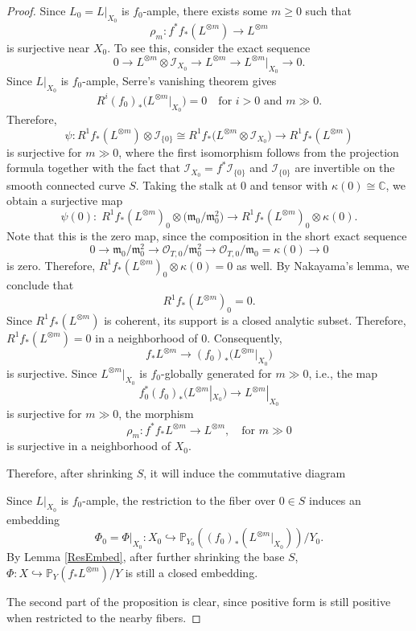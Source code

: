 \documentclass[10pt,a4paper]{amsart}
\begin{document}
\begin{proof}
Since $L_0 = L|_{X_0}$ is $f_0$-ample,  there exists some $m\ge 0$ such that
$$\rho_m : f^* f_* (L^{\otimes m})\to L^{\otimes m}$$is surjective near $X_0$. To see this, consider the exact sequence 
\[
0 \to L^{\otimes m} \otimes \mathcal{I}_{X_0} \to L^{\otimes m} \to L^{\otimes m}|_{X_0} \to 0.
\]
Since $L|_{X_0}$ is $f_0$-ample, Serre’s vanishing theorem gives 
\[
R^i (f_0)_* \bigl(L^{\otimes m}|_{X_0}\bigr) = 0 \quad \text{for } i>0 \text{ and } m \gg 0.
\]
Therefore,
\[
\psi: R^1 f_* (L^{\otimes m}) \otimes \mathcal{I}_{\{0\}} 
\cong R^1 f_*\bigl(L^{\otimes m} \otimes \mathcal{I}_{X_0}\bigr) 
\longrightarrow R^1 f_* (L^{\otimes m})
\]
is surjective for $m \gg 0$, where the first isomorphism follows from the projection formula together with the fact that $\mathcal{I}_{X_0}=f^*\mathcal{I}_{\{0\}}$ and $\mathcal{I}_{\{0\}}$ are invertible on the smooth connected curve $S$. Taking the stalk at $0$ and tensor with $\kappa(0)\cong \mathbb{C}$, we obtain a surjective map
\[
\psi(0): \;  R^1 f_* (L^{\otimes m})_0 \otimes \bigl(\mathfrak{m}_0 / \mathfrak{m}_0^2\bigr)
\longrightarrow R^1 f_* (L^{\otimes m})_0 \otimes \kappa(0).
\]
Note that this is the zero map, since the composition in the short exact sequence 
\[
0\to \mathfrak{m}_{0} /\mathfrak{m}_{0}^2 \to \mathcal{O}_{T,0} /\mathfrak{m}_{0}^2 \to \mathcal{O}_{T,0} /\mathfrak{m}_{0} = \kappa (0) \to 0
\] 
is zero. Therefore, $R^1 f_* (L^{\otimes m})_0 \otimes \kappa(0) = 0$ as well. By Nakayama’s lemma, we conclude that 
\[
R^1 f_* (L^{\otimes m})_0 = 0.
\]
Since $R^1 f_* (L^{\otimes m})$ is coherent, its support is a closed analytic subset. Therefore, $R^1 f_* (L^{\otimes m}) = 0$ in a neighborhood of $0$. Consequently,
\[
f_* L^{\otimes m} \longrightarrow (f_0)_* \bigl(L^{\otimes m}|_{X_0}\bigr)
\]
is surjective. Since $L^{\otimes m}|_{X_0}$ is $f_0$-globally generated for $m\gg 0$, i.e., the map
\[
f_0^* (f_0)_* (L^{\otimes m} |_{X_0} ) \to L^{\otimes m}|_{X_0}
\]
is surjective for $m\gg 0$, the morphism
\[
\rho_m: f^* f_* L^{\otimes m} \longrightarrow L^{\otimes m}, \quad \text{for } m\gg 0
\]
is surjective in a neighborhood of $X_0$.


Therefore, after shrinking $S$, it will induce the commutative diagram  
\begin{center}
\end{center}
Since $L|_{X_0}$ is $f_0$-ample, the restriction to the fiber over $0 \in S$ induces an embedding
$$\Phi_0 = \Phi|_{X_0}: X_0 \hookrightarrow \mathbb{P}_{Y_0}((f_0)_* (L^{\otimes m}|_{X_0}))/Y_0.$$
By Lemma \ref{ResEmbed}, after further shrinking the base $S$, $\Phi:X \hookrightarrow \mathbb{P}_{Y}(f_* L^{\otimes m})/Y$ is still a closed embedding.

The second part of the proposition is clear, since positive form is still positive when restricted to the nearby fibers. 
\end{proof}
\end{document}
